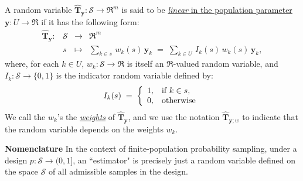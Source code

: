 \begin{definition}
\mbox{}
\vskip 0.1cm
\noindent
A random variable $\widehat{\mathbf{T}}_{\mathbf{y}} : \mathcal{S} \longrightarrow \Re^{m}$
is said to be \underline{\emph{linear} in the population parameter $\mathbf{y} : U \longrightarrow \Re$}
if it has the following form:
\begin{equation*}
\begin{array}{cccl}
\widehat{\mathbf{T}}_{\mathbf{y}} : & \mathcal{S} & \longrightarrow & \Re^{m} \\
     & s &\longmapsto & \underset{k\in s}{\sum}\,w_{k}(s)\,\mathbf{y}_{k} \;=\; \underset{k\in U}{\sum}\,I_{k}(s)\,w_{k}(s)\,\mathbf{y}_{k},
\end{array}
\end{equation*}
where, for each $k \in U$, $w_{k} : \mathcal{S} \longrightarrow \Re$ is itself
an $\Re$-valued random variable, and $I_{k} : \mathcal{S} \longrightarrow \{0,1\}$
is the indicator random variable defined by:
\begin{equation*}
I_{k}(s)
\;=\;
\left\{
\begin{array}{cl}
1, & \textnormal{if $k \in s$}, \\
0, & \textnormal{otherwise}
\end{array}
\right.
\end{equation*}
We call the $w_{k}$'s the \underline{\emph{weights}} of $\widehat{\mathbf{T}}_{\mathbf{y}}$,
and we use the notation $\widehat{\mathbf{T}}_{\mathbf{y};w}$ to indicate that the random
variable depends on the weights $w_{k}$.
\end{definition}

\noindent
\textbf{Nomenclature}
\;
In the context of finite-population probability sampling, under a design
$p : \mathcal{S} \longrightarrow (0,1]$,
an ``estimator" is precisely just a random variable defined on the space
$\mathcal{S}$ of all admissible samples in the design.

